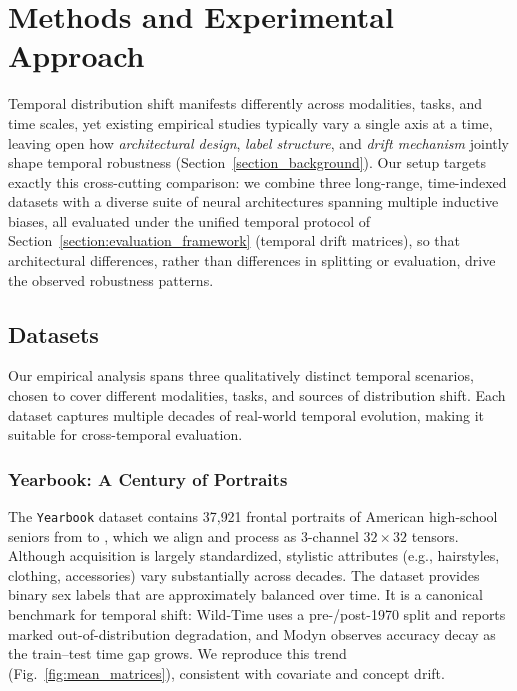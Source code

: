 
\section{Methods and Experimental Approach}
\label{section_methods}

Temporal distribution shift manifests differently across modalities, tasks, and time scales, yet existing empirical studies typically vary a single axis at a time, leaving open how \emph{architectural design}, \emph{label structure}, and \emph{drift mechanism} jointly shape temporal robustness (Section~\ref{section_background}). Our setup targets exactly this cross-cutting comparison: we combine three long-range, time-indexed datasets with a diverse suite of neural architectures spanning multiple inductive biases, all evaluated under the unified temporal protocol of Section~\ref{section:evaluation_framework} (temporal drift matrices), so that architectural differences, rather than differences in splitting or evaluation, drive the observed robustness patterns.

\subsection{Datasets}
Our empirical analysis spans three qualitatively distinct temporal scenarios, chosen to cover different modalities, tasks, and sources of distribution shift. Each dataset captures multiple decades of real-world temporal evolution, making it suitable for cross-temporal evaluation.

\subsubsection{Yearbook: A Century of Portraits}
The \texttt{Yearbook} dataset \iflncs\cite{ginosar2015century}\else\cite{yearbook_ginosar_2019}\fi{} contains 37{,}921 frontal portraits of American high-school seniors from  to , which we align and process as 3-channel $32\times32$ tensors. Although acquisition is largely standardized, stylistic attributes (e.g., hairstyles, clothing, accessories) vary substantially across decades. The dataset provides binary sex labels that are approximately balanced over time. It is a canonical benchmark for temporal shift: Wild-Time \cite{yao2022wildtime} uses a pre-/post-1970 split and reports marked out-of-distribution degradation, and Modyn \cite{boether_modyn_2025} observes accuracy decay as the train--test time gap grows. We reproduce this trend (Fig.~\ref{fig:mean_matrices}), consistent with covariate and concept drift.

